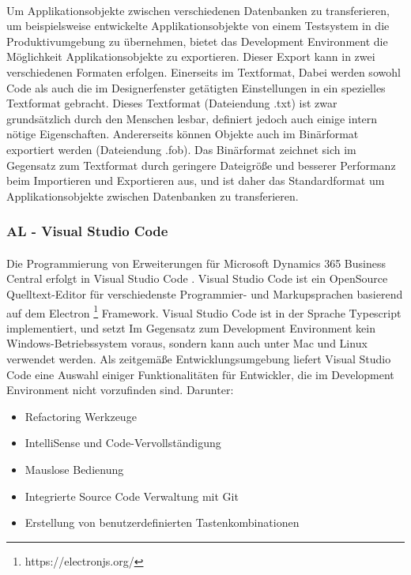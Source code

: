 \paragraph{}
Um Applikationsobjekte zwischen verschiedenen Datenbanken zu transferieren, um beispielsweise entwickelte Applikationsobjekte von einem Testsystem in die Produktivumgebung zu übernehmen, bietet das Development Environment die Möglichkeit Applikationsobjekte zu exportieren. Dieser Export kann in zwei verschiedenen Formaten erfolgen. Einerseits im Textformat, Dabei werden sowohl Code als auch die im Designerfenster getätigten Einstellungen in ein spezielles Textformat gebracht. Dieses Textformat (Dateiendung .txt) ist zwar grundsätzlich durch den Menschen lesbar, definiert jedoch auch einige intern nötige Eigenschaften. Andererseits können Objekte auch im Binärformat exportiert werden (Dateiendung .fob). Das Binärformat zeichnet sich im Gegensatz zum Textformat durch geringere Dateigröße und besserer Performanz beim Importieren und Exportieren aus, und ist daher das Standardformat um Applikationsobjekte zwischen Datenbanken zu transferieren.

\subsubsection{AL - Visual Studio Code}
\paragraph{}
Die Programmierung von Erweiterungen für Microsoft Dynamics 365 Business Central erfolgt in Visual Studio Code \cite{KahlertGiza2016}. Visual Studio Code ist ein OpenSource Quelltext-Editor für verschiedenste Programmier- und Markupsprachen basierend auf dem Electron \footnote{https://electronjs.org/} Framework. Visual Studio Code ist in der Sprache Typescript implementiert, und setzt Im Gegensatz zum Development Environment kein Windows-Betriebssystem voraus, sondern kann auch unter Mac und Linux verwendet werden. Als zeitgemäße Entwicklungsumgebung liefert Visual Studio Code eine Auswahl einiger Funktionalitäten für Entwickler, die im Development Environment nicht vorzufinden sind. Darunter:

\begin{itemize}
	\item Refactoring Werkzeuge
	\item IntelliSense und Code-Vervollständigung
	\item Mauslose Bedienung
	\item Integrierte Source Code Verwaltung mit Git
	\item Erstellung von benutzerdefinierten Tastenkombinationen
\end{itemize}

